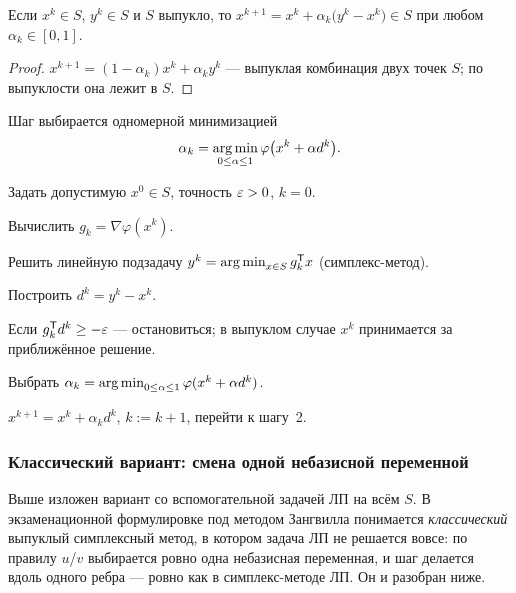 \begin{theorem}\label{thm:zangwill-feasible}
Если $x^k \in S$, $y^k \in S$ и $S$ выпукло, то
$x^{k+1} = x^k + \alpha_k\big(y^k - x^k\big) \in S$ при любом
$\alpha_k \in [0,1]$.
\end{theorem}

\begin{proof}
$x^{k+1} = (1-\alpha_k)x^k + \alpha_k y^k$ — выпуклая комбинация двух точек
$S$; по выпуклости она лежит в $S$.
\end{proof}

Шаг выбирается одномерной минимизацией
\[
  \alpha_k = \operatorname*{arg\,min}_{0 \le \alpha \le 1} \varphi\big(x^k + \alpha d^k\big) .
\]

\begin{algo}[title={Выпуклый симплексный метод Зангвилла}]
\begin{steps}
  \item Задать допустимую $x^0 \in S$, точность $\varepsilon > 0$, $k = 0$.
  \item Вычислить $g_k = \nabla\varphi(x^k)$.
  \item Решить линейную подзадачу $y^k = \operatorname*{arg\,min}_{x\in S} g_k^{\mathsf{T}} x$ (симплекс-метод).
  \item Построить $d^k = y^k - x^k$.
  \item Если $g_k^{\mathsf{T}} d^k \ge -\varepsilon$ — остановиться; в выпуклом случае $x^k$
        принимается за приближённое решение.
  \item Выбрать $\alpha_k = \operatorname*{arg\,min}_{0\le\alpha\le1}\varphi(x^k + \alpha d^k)$.
  \item $x^{k+1} = x^k + \alpha_k d^k$, $k := k+1$, перейти к шагу~2.
\end{steps}
\end{algo}

\subsubsection*{Классический вариант: смена одной небазисной переменной}

\begin{idea}[title={Откуда этот материал}]
Выше изложен вариант со вспомогательной задачей ЛП на всём $S$. В
экзаменационной формулировке под методом Зангвилла понимается \emph{классический}
выпуклый симплексный метод, в котором задача ЛП не решается вовсе: по правилу
$u$/$v$ выбирается ровно одна небазисная переменная, и шаг делается вдоль
одного ребра — ровно как в симплекс-методе ЛП. Он и разобран ниже.
\end{idea}

